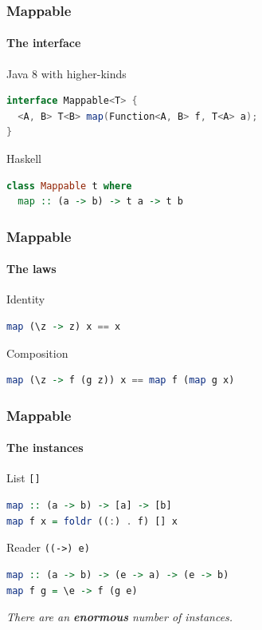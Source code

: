 \begin{frame}[fragile]
\frametitle{Mappable}
\framesubtitle{The interface}
\begin{block}{Java 8 with higher-kinds}
\begin{lstlisting}[style=language,language=java]
interface Mappable<T> {
  <A, B> T<B> map(Function<A, B> f, T<A> a);
}
\end{lstlisting}
\end{block}
\begin{block}{Haskell}
\begin{lstlisting}[style=language,language=haskell]
class Mappable t where
  map :: (a -> b) -> t a -> t b
\end{lstlisting}
\end{block}
\end{frame}

\begin{frame}[fragile]
\frametitle{Mappable}
\framesubtitle{The laws}
\begin{block}{Identity}
\begin{lstlisting}[style=language,language=haskell]
map (\z -> z) x == x
\end{lstlisting}
\end{block}
\begin{block}{Composition}
\begin{lstlisting}[style=language,language=haskell]
map (\z -> f (g z)) x == map f (map g x)
\end{lstlisting}
\end{block}
\end{frame}

\begin{frame}[fragile]
\frametitle{Mappable}
\framesubtitle{The instances}
\begin{block}{List \lstinline{[]}}
\begin{lstlisting}[style=language,language=haskell]
map :: (a -> b) -> [a] -> [b]
map f x = foldr ((:) . f) [] x
\end{lstlisting}
\end{block}
\begin{block}{Reader \lstinline{((->) e)}}
\begin{lstlisting}[style=language,language=haskell]
map :: (a -> b) -> (e -> a) -> (e -> b)
map f g = \e -> f (g e)
\end{lstlisting}
\end{block}
\emph{There are an \textbf{enormous} number of instances.}
\end{frame}

